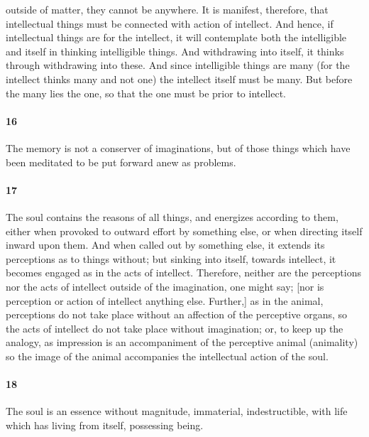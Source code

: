 \documentclass{article}
\begin{document}
outside of matter, they cannot be anywhere. It is manifest, therefore, that intellectual things must be connected with action of intellect. And hence, if intellectual things are for the intellect, it will contemplate both the intelligible and itself in thinking intelligible things. And withdrawing into itself, it thinks through withdrawing into these. And since intelligible things are many (for the intellect thinks many and not one) the intellect itself must be many. But before the many lies the one, so that the one must be prior to intellect.

\paragraph{16} The memory is not a conserver of imaginations, but of those things which have been meditated to be put forward anew as problems.

\paragraph{17} The soul contains the reasons of all things, and energizes according to them, either when provoked to outward effort by something else, or when directing itself inward upon them. And when called out by something else, it extends its perceptions as to things without; but sinking into itself, towards intellect, it becomes engaged as in the acts of intellect. Therefore, neither are the perceptions nor the acts of intellect outside of the imagination, one might say; [nor is perception or action of intellect anything else. Further,] as in the animal, perceptions do not take place without an affection of the perceptive organs, so the acts of intellect do not take place without imagination; or, to keep up the analogy, as impression is an accompaniment of the perceptive animal (animality) so the image of the animal accompanies the intellectual action of the soul.

\paragraph{18} The soul is an essence without magnitude, immaterial, indestructible, with life which has living from itself, possessing being.
\end{document}
